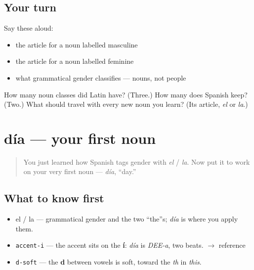 \subsection*{Your turn}
Say these aloud:

\begin{itemize}
\raggedright
  \item the article for a noun labelled masculine
  \item the article for a noun labelled feminine
  \item what grammatical gender classifies — nouns, not people
\end{itemize}

\begin{tcolorbox}[breakable,colback=teal!4,colframe=teal!35!black,title={Before you move on}]
How many noun classes did Latin have? (Three.) How many does Spanish keep? (Two.) What should travel with every new noun you learn? (Its article, \emph{el} or \emph{la}.)
\end{tcolorbox}
\section[día]{día — your first noun}

\label{lesson:ES-C01-dia}



\begin{quote}
You just learned how Spanish tags gender with \emph{el} / \emph{la}. Now put it to work on your very first noun — \emph{día}, \textquotedblleft{}day.\textquotedblright{}
\end{quote}

\subsection*{What to know first}
\begin{itemize}
\raggedright
  \item el / la — grammatical gender and the two \textquotedblleft{}the\textquotedblright{}s; \emph{día} is where you apply them.
\end{itemize}

\begin{sounds}
\begin{itemize}
\raggedright
  \item \texttt{accent-i} — the accent sits on the \textbf{í}: \emph{día} is \emph{DEE-a}, two beats. $\to$ reference
  \item \texttt{d-soft} — the \textbf{d} between vowels is soft, toward the \emph{th} in \emph{this}.
\end{itemize}
\end{sounds}

